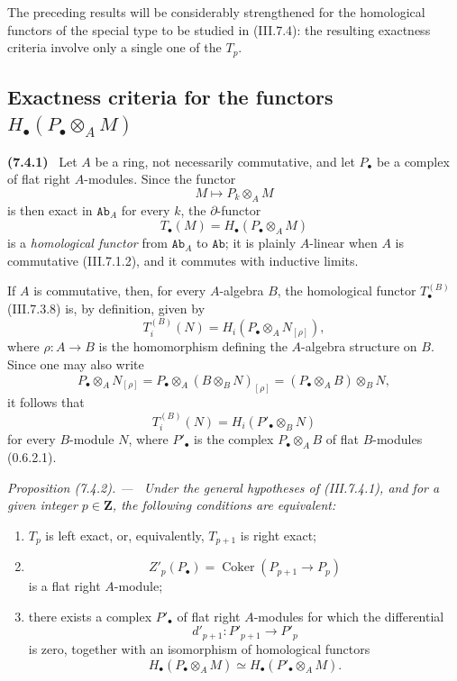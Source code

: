 \documentclass[10pt,oneside]{book}
\newcommand{\bb}[1]{\mathbf{#1}}
\newcommand{\cat}[1]{\mathtt{#1}}
\newcommand{\Coker}{\operatorname{Coker}}
\newcommand{\sref}[2][]{(#2)}
\newcommand{\oldpage}[2][]{\setcounter{footnote}{0}\marginpar{\scriptsize\textbf{#1}~|~#2}\ignorespaces}
\newenvironment{env}[1][]{\par\medskip\noindent\textbf{(#1)}\ }{\par}
\newenvironment{proposition}[1][]{\par\medskip\noindent\itshape Proposition (#1). ---\ }{\par}
\begin{document}
The preceding results will be considerably strengthened for
the homological functors of the special type to be studied in
\sref{III.7.4}: the resulting exactness criteria involve only
a single one of the $T_p$.


\subsection{\texorpdfstring{Exactness criteria for the functors
$H_\bullet(P_\bullet\otimes_A M)$}{Exactness criteria for the functors H.(P. tensor M)}}
\label{subsection:III.7.4}
\label{III.7.4}

\begin{env}[7.4.1]
\label{III.7.4.1}
Let $A$ be a ring, not necessarily commutative, and let
$P_\bullet$ be a complex of flat right $A$-modules.  Since the
functor
\[
  M\longmapsto P_k\otimes_A M
\]
is then exact in $\cat{Ab}_A$ for every $k$, the
$\partial$-functor
\[
  T_\bullet(M)=H_\bullet(P_\bullet\otimes_A M)
  \tag{7.4.1.1}\label{III.7.4.1.1.eq}
\]
\oldpage[III]{186}
is a \emph{homological functor} from $\cat{Ab}_A$ to
$\cat{Ab}$; it is plainly $A$-linear when $A$ is commutative
\sref{III.7.1.2}, and it commutes with inductive limits.

If $A$ is commutative, then, for every $A$-algebra $B$, the
homological functor $T_\bullet^{(B)}$ \sref{III.7.3.8} is, by
definition, given by
\[
  T_i^{(B)}(N)
  =
  H_i(P_\bullet\otimes_A N_{[\rho]}),
  \tag{7.4.1.2}\label{III.7.4.1.2.eq}
\]
where $\rho:A\to B$ is the homomorphism defining the
$A$-algebra structure on $B$.  Since one may also write
\[
  P_\bullet\otimes_A N_{[\rho]}
  =
  P_\bullet\otimes_A(B\otimes_B N)_{[\rho]}
  =
  (P_\bullet\otimes_A B)\otimes_B N,
\]
it follows that
\[
  T_i^{(B)}(N)
  =
  H_i(P'_\bullet\otimes_B N)
  \tag{7.4.1.3}\label{III.7.4.1.3.eq}
\]
for every $B$-module $N$, where $P'_\bullet$ is the complex
$P_\bullet\otimes_A B$ of flat $B$-modules
\sref[0]{0.6.2.1}.
\end{env}

\begin{proposition}[7.4.2]
\label{III.7.4.2}
Under the general hypotheses of \sref{III.7.4.1}, and for a
given integer $p\in\bb{Z}$, the following conditions are
equivalent:
\begin{enumerate}
  \item[(a)] $T_p$ is left exact, or, equivalently,
    $T_{p+1}$ is right exact;
  \item[(b)]
    \[
      Z'_p(P_\bullet)
      =
      \Coker(P_{p+1}\longrightarrow P_p)
    \]
    is a flat right $A$-module;
  \item[(c)] there exists a complex $P'_\bullet$ of flat right
    $A$-modules for which the differential
    \[
      d'_{p+1}:P'_{p+1}\longrightarrow P'_p
    \]
    is zero, together with an isomorphism of homological
    functors
    \[
      H_\bullet(P_\bullet\otimes_A M)
      \simeq
      H_\bullet(P'_\bullet\otimes_A M).
    \]
\end{enumerate}
\end{proposition}
\end{document}
